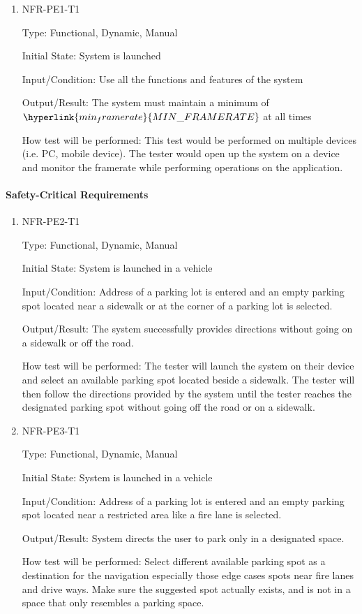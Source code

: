 \documentclass[12pt, titlepage]{article}
\begin{document}
\begin{enumerate}

\item{NFR-PE1-T1}

Type: Functional, Dynamic, Manual
					
Initial State: System is launched
					
Input/Condition: Use all the functions and features of the system
					
Output/Result: The system must maintain a minimum of
$\hyperlink{min_framerate}{MIN\_FRAMERATE}$ at all times
					
How test will be performed: This test would be performed on multiple devices
(i.e. PC, mobile device). The tester would open up the system on a device and
monitor the framerate while performing operations on the application.
					
\end{enumerate}

\paragraph{Safety-Critical Requirements}

\begin{enumerate}

\item{NFR-PE2-T1}

Type: Functional, Dynamic, Manual
					
Initial State: System is launched in a vehicle
					
Input/Condition: Address of a parking lot is entered and an empty parking spot
located near a sidewalk or at the corner of a parking lot is selected.
					
Output/Result: The system successfully provides directions without going on a
sidewalk or off the road.
					
How test will be performed: The tester will launch the system on their device
and select an available parking spot located beside a sidewalk. The tester will
then follow the directions provided by the system until the tester reaches the
designated parking spot without going off the road or on a sidewalk.

\item{NFR-PE3-T1}

Type: Functional, Dynamic, Manual
					
Initial State: System is launched in a vehicle
					
Input/Condition: Address of a parking lot is entered and an empty parking spot
located near a restricted area like a fire lane is selected.
					
Output/Result: System directs the user to park only in a designated space.
					
How test will be performed: Select different available parking spot as a
destination for the navigation especially those edge cases spots near fire lanes
and drive ways. Make sure the suggested spot actually exists, and is not in a
space that only resembles a parking space.
					
\end{enumerate}
\end{document}
